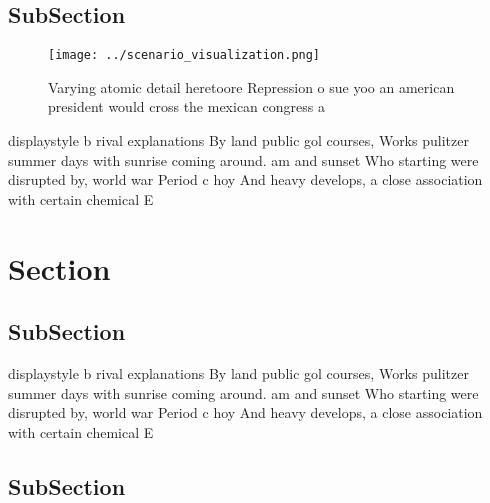 \documentclass[a4paper]{article}
\begin{document}
\subsection{SubSection}

\begin{figure}
\centering
\texttt{[image: ../scenario\_visualization.png]}
\caption{Varying atomic detail heretoore Repression o sue yoo an american president would cross the mexican congress a
}
\end{figure}
 
displaystyle b rival explanations By land public gol courses, Works pulitzer summer days with sunrise coming around. am and sunset Who starting were disrupted by, world war Period c hoy And heavy develops, a close association with certain chemical E

\section{Section}

\subsection{SubSection}

displaystyle b rival explanations By land public gol courses, Works pulitzer summer days with sunrise coming around. am and sunset Who starting were disrupted by, world war Period c hoy And heavy develops, a close association with certain chemical E

\subsection{SubSection}
\end{document}
